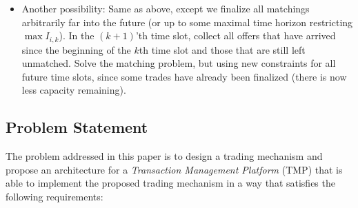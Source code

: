 \begin{itemize}
\item Another possibility: Same as above, except we finalize all matchings arbitrarily far into the future (or up to some maximal time horizon restricting $\max I_{i,k}$). In the $(k+1)$'th time slot, collect all offers that have arrived since the beginning of the $k$th time slot and those that are still left unmatched. Solve the matching problem, but using new constraints for all future time slots, since some trades have already been finalized (there is now less capacity remaining). 
\end{itemize}


\subsection{Problem Statement}
The problem addressed in this paper is to design a trading mechanism and propose an architecture for a \emph{Transaction Management Platform} (TMP) that is able to implement the proposed trading mechanism in a way that satisfies the following requirements:
